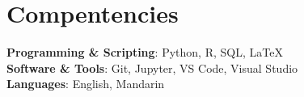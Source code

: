 \documentclass[a4paper,11pt]{article}
\begin{document}
%
\section{Compentencies}
\begin{itemize}[leftmargin=0.15in, label={}]
    \small{\item{
        \textbf{Programming \& Scripting}{: Python, R, SQL, LaTeX} \\
        \textbf{Software \& Tools}{: Git, Jupyter, VS Code, Visual Studio} \\
        \textbf{Languages}{: English, Mandarin}
    }}
\end{itemize}




\end{document}
